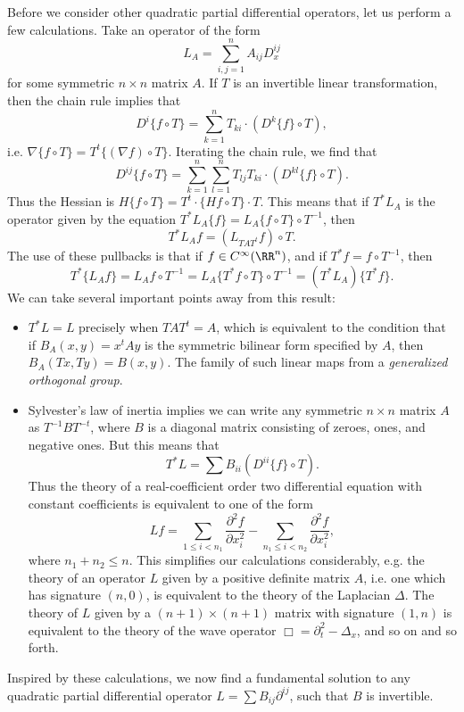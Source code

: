 Before we consider other quadratic partial differential operators, let us perform a few calculations. Take an operator of the form
%
\[ L_A = \sum_{i,j = 1}^n A_{ij} D^{ij}_x \]
%
for some symmetric $n \times n$ matrix $A$. If $T$ is an invertible linear transformation, then the chain rule implies that
%
\[ D^i \{ f \circ T \} = \sum_{k = 1}^n T_{ki} \cdot (D^k \{ f \} \circ T), \]
%
i.e. $\nabla \{ f \circ T \} = T^t \{ (\nabla f) \circ T \}$. Iterating the chain rule, we find that
%
\[ D^{ij} \{ f \circ T \} = \sum_{k = 1}^n \sum_{l = 1}^n T_{lj} T_{ki} \cdot (D^{kl} \{ f \} \circ T). \]
%
Thus the Hessian is $H \{ f \circ T \} = T^t \cdot \{ Hf \circ T \} \cdot T$. This means that if $T^* L_A$ is the operator given by the equation $T^*L_A \{ f \} = L_A \{ f \circ T \} \circ T^{-1}$, then
%
\[ T^*L_A f = (L_{TAT^t} f) \circ T. \]
%
The use of these pullbacks is that if $f \in C^\infty(\RR^n)$, and if $T^* f = f \circ T^{-1}$, then
%
\[ T^* \{ L_A f \} = L_A f \circ T^{-1} = L_A \{ T^* f \circ T \} \circ T^{-1} = (T^* L_A) \{ T^* f \}. \]
%
We can take several important points away from this result:
%
\begin{itemize}
    \item $T^*L = L$ precisely when $TAT^t = A$, which is equivalent to the condition that if $B_A(x,y) = x^t A y$ is the symmetric bilinear form specified by $A$, then $B_A(Tx,Ty) = B(x,y)$. The family of such linear maps from a \emph{generalized orthogonal group}.

    \item Sylvester's law of inertia implies we can write any symmetric $n \times n$ matrix $A$ as $T^{-1} B T^{-t}$, where $B$ is a diagonal matrix consisting of zeroes, ones, and negative ones. But this means that
    \[ T^* L = \sum B_{ii} (D^{ii} \{ f \} \circ T). \]
    Thus the theory of a real-coefficient order two differential equation with constant coefficients is equivalent to one of the form
    \[ Lf = \sum_{1 \leq i < n_1} \frac{\partial^2 f}{\partial x_i^2} - \sum_{n_1 \leq i < n_2} \frac{\partial^2 f}{\partial x_i^2}, \]
    where $n_1 + n_2 \leq n$. This simplifies our calculations considerably, e.g. the theory of an operator $L$ given by a positive definite matrix $A$, i.e. one which has signature $(n,0)$, is equivalent to the theory of the Laplacian $\Delta$. The theory of $L$ given by a $(n+1) \times (n+1)$ matrix with signature $(1,n)$ is equivalent to the theory of the wave operator $\Box = \partial_t^2 - \Delta_x$, and so on and so forth.
\end{itemize}
%
Inspired by these calculations, we now find a fundamental solution to any quadratic partial differential operator $L = \sum B_{ij} \partial^{ij}$, such that $B$ is invertible.

